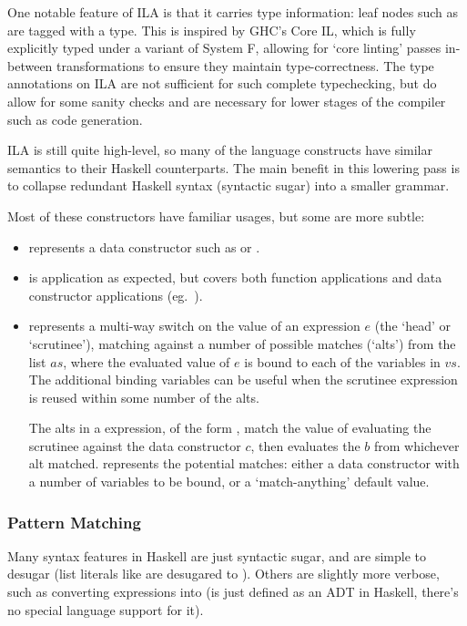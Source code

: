 \documentclass[dissertation.tex]{subfiles}
\begin{document}
{{{            One notable feature of ILA is that it carries type information: leaf nodes such as  are tagged with a type. This is inspired by GHC's Core IL, which is fully explicitly typed under a variant of System F, allowing for `core linting' passes in-between transformations to ensure they maintain type-correctness. The type annotations on ILA are not sufficient for such complete typechecking, but do allow for some sanity checks and are necessary for lower stages of the compiler such as code generation.

            ILA is still quite high-level, so many of the language constructs have similar semantics to their Haskell counterparts. The main benefit in this lowering pass is to collapse redundant Haskell syntax (syntactic sugar) into a smaller grammar.

            Most of these constructors have familiar usages, but some are more subtle:

            \begin{itemize}
            \item {} represents a data constructor such as  or .
            \item
            {
                 is application as expected, but covers both function applications and data constructor applications (eg.\ ).
            }
            \item
            {
                 represents a multi-way switch on the value of an expression \(e\) (the `head' or `scrutinee'), matching against a number of possible matches (`alts') from the list \(as\), where the evaluated value of \(e\) is bound to each of the variables in \(vs\). The additional binding variables can be useful when the scrutinee expression is reused within some number of the alts. 

                The alts in a  expression, of the form , match the value of evaluating the scrutinee against the data constructor \(c\), then evaluates the \(b\) from whichever alt matched.  represents the potential matches: either a data constructor with a number of variables to be bound, or a `match-anything' default value.
            }
            \end{itemize}
        }
        \subsubsection{Pattern Matching}
        {
            Many syntax features in Haskell are just syntactic sugar, and are simple to desugar (list literals like \haskell{[1, 2]} are desugared to ). Others are slightly more verbose, such as converting  expressions into  (is just defined as an ADT in Haskell, there's no special language support for it).

}}}
\end{document}
